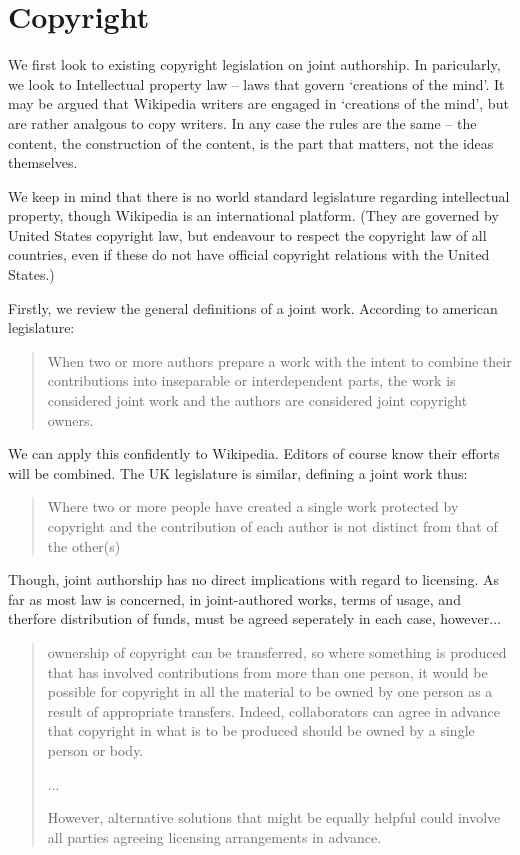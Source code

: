 \section{Copyright}
\label{sec:copyright}
We first look to existing copyright legislation on joint
authorship. In paricularly, we look to Intellectual property law --
laws that govern `creations of the mind'. It may be argued that
Wikipedia writers are engaged in `creations of the mind', but are
rather analgous to copy writers. In any case the rules are the same --
the content, the construction of the content, is the part that
matters, not the ideas themselves.\cite{i-property}

We keep in mind that there is no world standard legislature regarding
intellectual property, though Wikipedia is an international
platform. (They are governed by United States copyright law, but
endeavour to respect the copyright law of all countries, even if these
do not have official copyright relations with the United States.)\cite{wiki-letter}

Firstly, we review the general definitions of a joint work. According
to american legislature:

\begin{quote}
  When two or more authors prepare a work with the intent to combine
  their contributions into inseparable or interdependent parts, the
  work is considered joint work and the authors are considered joint
  copyright owners.\cite{what-joint-authorship}
\end{quote}

We can apply this confidently to Wikipedia. Editors of course know
their efforts will be combined. The UK legislature is similar,
defining a joint work thus:

\begin{quote}
  Where two or more people have created a single work protected by
  copyright and the contribution of each author is not distinct from
  that of the other(s) \cite{joint-authorship}
\end{quote}

Though, joint authorship has no direct implications with regard to
licensing. As far as most law is concerned, in joint-authored works,
terms of usage, and therfore distribution of funds, must be agreed
seperately in each case, however...

\begin{quote}
  ownership of copyright can be transferred, so where something is
  produced that has involved contributions from more than one person,
  it would be possible for copyright in all the material to be owned
  by one person as a result of appropriate transfers. Indeed,
  collaborators can agree in advance that copyright in what is to be
  produced should be owned by a single person or body. 

  ... 

  However, alternative solutions that might be equally helpful could
  involve all parties agreeing licensing arrangements in
  advance.\cite{joint-authorship}
\end{quote}

